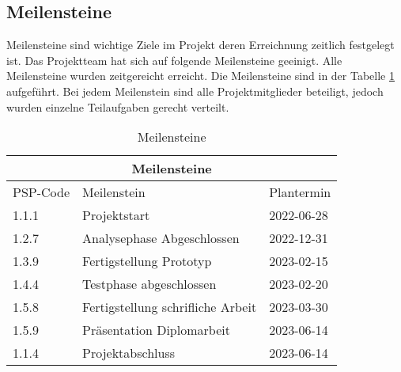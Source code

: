 \subsection{Meilensteine}

Meilensteine sind wichtige Ziele im Projekt deren Erreichnung zeitlich festgelegt ist. Das Projektteam hat sich auf folgende Meilensteine geeinigt. Alle Meilensteine wurden zeitgereicht erreicht. Die Meilensteine sind in der Tabelle \ref{tab:meilensteine} aufgeführt. Bei jedem Meilenstein sind alle Projektmitglieder beteiligt, jedoch wurden einzelne Teilaufgaben gerecht verteilt.

\begin{table}[H]
  \begin{center}
    \begin{tabular} {lll}
      \multicolumn{3}{c}{\textbf{Meilensteine}}                 \\
      \toprule
      PSP-Code & Meilenstein                       & Plantermin \\
      \midrule
      1.1.1    & Projektstart                      & 2022-06-28 \\
      1.2.7    & Analysephase Abgeschlossen        & 2022-12-31 \\
      1.3.9    & Fertigstellung Prototyp           & 2023-02-15 \\
      1.4.4    & Testphase abgeschlossen           & 2023-02-20 \\
      1.5.8    & Fertigstellung schrifliche Arbeit & 2023-03-30 \\
      1.5.9    & Präsentation Diplomarbeit         & 2023-06-14 \\
      1.1.4    & Projektabschluss                  & 2023-06-14 \\
      \bottomrule
    \end{tabular}
    \caption{Meilensteine}
    \label{tab:meilensteine}
  \end{center}
\end{table}